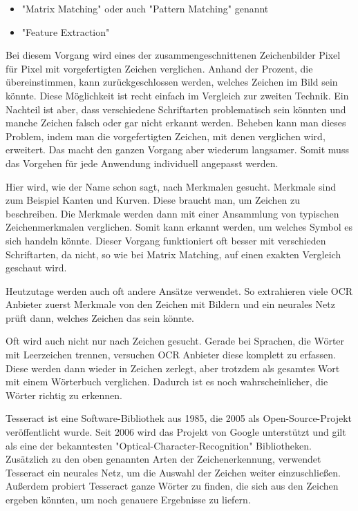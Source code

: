 \begin{itemize}
    \item "Matrix Matching" oder auch "Pattern Matching" genannt
    \item "Feature Extraction"
\end{itemize}


Bei diesem Vorgang wird eines der zusammengeschnittenen Zeichenbilder Pixel für Pixel mit vorgefertigten Zeichen verglichen. Anhand der Prozent, die übereinstimmen, kann zurückgeschlossen werden, welches Zeichen im Bild sein könnte. Diese Möglichkeit ist recht einfach im Vergleich zur zweiten Technik. Ein Nachteil ist aber, dass verschiedene Schriftarten problematisch sein könnten und manche Zeichen falsch oder gar nicht erkannt werden. Beheben kann man dieses Problem, indem man die vorgefertigten Zeichen, mit denen verglichen wird, erweitert. Das macht den ganzen Vorgang aber wiederum langsamer. Somit muss das Vorgehen für jede Anwendung individuell angepasst werden. \cite{OCRRecognition}


Hier wird, wie der Name schon sagt, nach Merkmalen gesucht. Merkmale sind zum Beispiel Kanten und Kurven. Diese braucht man, um Zeichen zu beschreiben. Die Merkmale werden dann mit einer Ansammlung von typischen Zeichenmerkmalen verglichen. Somit kann erkannt werden, um welches Symbol es sich handeln könnte. Dieser Vorgang funktioniert oft besser mit verschieden Schriftarten, da nicht, so wie bei Matrix Matching, auf einen exakten Vergleich geschaut wird. \cite{OCRRecognition}


Heutzutage werden auch oft andere Ansätze verwendet. So extrahieren viele OCR Anbieter zuerst Merkmale von den Zeichen mit Bildern und ein neurales Netz prüft dann, welches Zeichen das sein könnte.

Oft wird auch nicht nur nach Zeichen gesucht. Gerade bei Sprachen, die Wörter mit Leerzeichen trennen, versuchen OCR Anbieter diese komplett zu erfassen. Diese werden dann wieder in Zeichen zerlegt, aber trotzdem als gesamtes Wort mit einem Wörterbuch verglichen. Dadurch ist es noch wahrscheinlicher, die Wörter richtig zu erkennen. 

\label{sec:tesseract}

Tesseract ist eine Software-Bibliothek aus 1985, die 2005 als Open-Source-Projekt veröffentlicht wurde. Seit 2006 wird das Projekt von Google unterstützt und gilt als eine der bekanntesten "Optical-Character-Recognition" Bibliotheken. Zusätzlich zu den oben genannten Arten der Zeichenerkennung, verwendet Tesseract ein neurales Netz, um die Auswahl der Zeichen weiter einzuschließen. Außerdem probiert Tesseract ganze Wörter zu finden, die sich aus den Zeichen ergeben könnten, um noch genauere Ergebnisse zu liefern. \cite{Tesseract}

